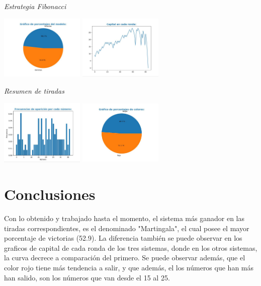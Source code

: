 \documentclass{article}
\begin{document}
    \vspace{1cm}

    {\itshape\Large Estrategia Fibonacci \par}

    \includegraphics[width=0.3\textwidth]{fibo1.JPG}
    \includegraphics[width=0.3\textwidth]{fibo2.JPG}

    \vspace{1cm}

    {\itshape\Large Resumen de tiradas \par}
    \includegraphics[width=0.3\textwidth]{frecAparicion.JPG}
    \includegraphics[width=0.3\textwidth]{resumenColores.JPG}

    \section{Conclusiones}

    Con lo obtenido y trabajado hasta el momento,
    el sistema más ganador en las tiradas correspondientes, es el denominado "Martingala",
    el cual posee el mayor porcentaje de victorias (52.9).
    La diferencia también se puede observar en los graficos de capital de cada ronda de los tres sistemas, donde
    en los otros sistemas, la curva decrece a comparación del primero. Se puede observar además, que el color rojo tiene más tendencia a salir,
    y que además, el los números que han más han salido, son los números que van desde el 15 al 25.
\end{document}
